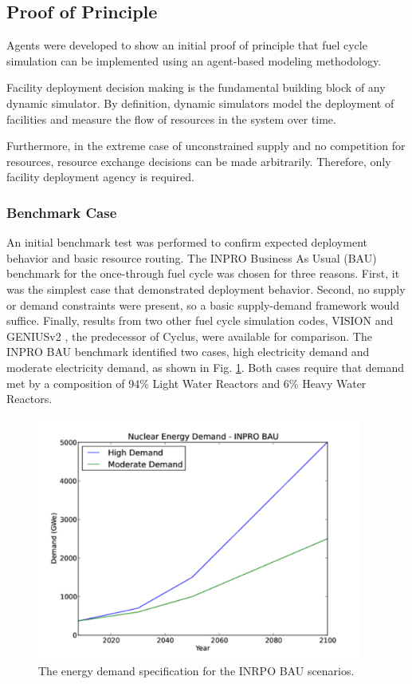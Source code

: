 \subsection{Proof of Principle}\label{abm:abm:proof}

Agents were developed to show an initial proof of principle that fuel cycle
simulation can be implemented using an agent-based modeling methodology.

Facility deployment decision making is the fundamental building block of any
dynamic simulator. By definition, dynamic simulators model the deployment of
facilities and measure the flow of resources in the system over time. 

Furthermore, in the extreme case of unconstrained supply and no competition for
resources, resource exchange decisions can be made arbitrarily. Therefore, only
facility deployment agency is required.

\subsubsection{Benchmark Case}

An initial benchmark test was performed to confirm expected deployment behavior
and basic resource routing. The INPRO Business As Usual (BAU) benchmark for the
once-through fuel cycle was chosen for three reasons. First, it was the simplest
case that demonstrated deployment behavior. Second, no supply or demand
constraints were present, so a basic supply-demand framework would
suffice. Finally, results from two other fuel cycle simulation codes, VISION
\cite{} and GENIUSv2 \cite{}, the predecessor of Cyclus, were available for
comparison. The INPRO BAU benchmark identified two cases, high electricity
demand and moderate electricity demand, as shown in
Fig. \ref{fig:inpro-demand}. Both cases require that demand met by a composition
of 94\% Light Water Reactors and 6\% Heavy Water Reactors.

\begin{figure}
  \begin{center}
    \includegraphics[height=8cm]{./figs/inpro-demand.pdf}
    \caption{The energy demand specification for the INRPO BAU scenarios.}
    \label{fig:inpro-demand}
  \end{center}  
\end{figure}

